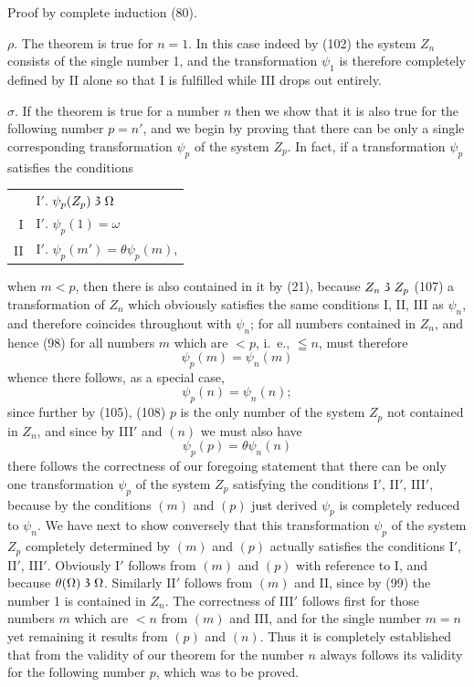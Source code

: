 \documentclass[oneside]{book}
\newcommand\partof{\mathrel{\raisebox{0.45ex}{$\mathfrak{3}$}}}   %
\begin{document}
Proof by complete induction (80).

$\rho$. \label{psi1}The theorem is true for $n = 1$. In this case indeed
by (102) the system $Z_{n}$ consists of the single
number 1, and the transformation $\psi_1$ %
is therefore completely
defined by II alone so that I is fulfilled while
III drops out entirely.

$\sigma$. If the theorem is true for a number $n$ then we
show that it is also true for the following number
$p=n'$, and we begin by proving that there can be only
a single corresponding transformation $\psi_p$ of the system
$Z_p$. In fact, if a transformation $\psi_p$ satisfies the
conditions
\par\begin{tabular}[b]{@{}r@{}l@{}}
  &I$'$. $\psi_p(Z_p) \partof \Omega$ \\
 I&I$'$. $\psi_p(1)=\omega$\\
II&I$'$. $\psi_p(m')=\theta\psi_p(m)$,
\end{tabular}
when $m<p$, then there is
also contained in it by (21), because $Z_n \partof Z_p$ (107) a
transformation of $Z_{n}$ which obviously satisfies the
same conditions I, II, III as $\psi_n$, and therefore coincides
throughout with $\psi_n$; for all numbers contained
in $Z_{n}$, and hence (98) for all numbers $m$ which are
$<p$, i.~e., $\leqq n$, must therefore
\[
\psi_p(m)=\psi_n(m) \tag{$m$}
\]
whence there follows, as a special case,
\[
\psi_p(n)=\psi_n(n); \tag{$n$}
\]
since further by (105), (108) $p$ is the only number of
the system $Z_p$ not contained in $Z_n$, and since by III$'$
and $(n)$ we must also have
\[
\psi_p(p) = \theta\psi_n(n) \tag{$p$}
\]
there follows the correctness of our foregoing statement
that there can be only one transformation $\psi_p$ of
the system $Z_p$ satisfying the conditions I$'$, II$'$, III$'$,
because by the conditions $(m)$ and $(p)$ just derived
$\psi_p$ is completely reduced to $\psi_n$. We have next to show
conversely that this transformation $\psi_p$ of the system
$Z_p$ completely determined by $(m)$ and $(p)$ actually
satisfies the conditions I$'$, II$'$, III$'$. Obviously I$'$ follows
from $(m)$ and $(p)$ with reference to I, and because
$\theta(\Omega) \partof \Omega$. Similarly II$'$ follows from $(m)$ and II, since
by (99) the number 1 is contained in $Z_n$. The correctness
of III$'$ follows first for those numbers $m$ which
are $<n$ from $(m)$ and III, and for the single number
$m=n$ yet remaining it results from $(p)$ and $(n)$. Thus
it is completely established that from the validity of
our theorem for the number $n$ always follows its validity
for the following number $p$, which was to be proved.
\end{document}
